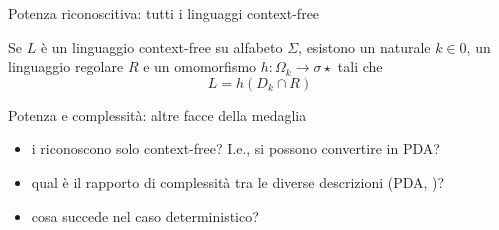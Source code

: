 \documentclass{beamer}
\begin{document}
\begin{frame}{Potenza riconoscitiva: tutti i linguaggi context-free}
	\begin{theor}
		Se $L$ è un linguaggio context-free su alfabeto $\Sigma$, esistono un naturale $k\in0$, un linguaggio regolare $R$ e un omomorfismo $h:\Omega_k\to\sigma\star$ tali che
		\begin{equation*}
			L=h(D_k\cap R)
		\end{equation*}
	\end{theor}
\end{frame}

\begin{frame}{Potenza e complessità: altre facce della medaglia}
	\begin{itemize}
		\item i  riconoscono solo context-free? I.e., si possono convertire in PDA?
		\item qual è il rapporto di complessità tra le diverse descrizioni (PDA, )?
		\item cosa succede nel caso deterministico?
	\end{itemize}
\end{frame}
\end{document}
